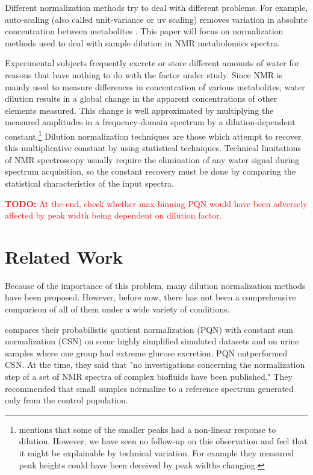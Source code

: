 \documentclass[english]{article}
\newcommand{\todo}[1]{\textcolor{red}{\textbf{TODO:} #1}}
\begin{document}
Different normalization methods try to deal with different problems. For example, auto-scaling (also called unit-variance or uv scaling) removes variation in absolute concentration between metabolites \citep{VanDenBerg2006}. This paper will focus on normalization methods used to deal with sample dilution in NMR metabolomics spectra.

Experimental subjects frequently excrete or store different amounts of water for reasons that have nothing to do with the factor under study. Since NMR is mainly used to measure differences in concentration of various metabolites, water dilution results in a global change in the apparent concentrations of other elements measured. This change is well approximated by multiplying the measured amplitudes in a frequency-domain spectrum by a dilution-dependent constant.\footnote{\citep{Zhang2009a} mentions that some of the smaller peaks had a non-linear response to dilution. However, we have seen no follow-up on this observation and feel that it might be explainable by technical variation. For example they measured peak heights could have been deceived by peak widths changing.} Dilution normalization techniques are those which attempt to recover this multiplicative constant by using statistical techniques. Technical limitations of NMR spectroscopy usually require the elimination of any water signal during spectrum acquisition, so the constant recovery must be done by comparing the statistical characteristics of the input spectra.

\todo{At the end, check whether max-binning PQN would have been adversely affected by peak width being dependent on dilution factor.}

\section{Related Work}
Because of the importance of this problem, many dilution normalization methods have been proposed. However, before now, there has not been a comprehensive comparison of all of them under a wide variety of conditions.

\citep{VanDenBerg2006} compares their probabilistic quotient normalization (PQN) with constant sum normalization (CSN) on some highly simplified simulated datasets and on urine samples where one group had extreme glucose excretion. PQN outperformed CSN. At the time, they said that "no investigations concerning the normalization step of a set of NMR spectra of complex biofluids have been published." They recommended that small samples normalize to a reference spectrum generated only from the control population.
\end{document}
